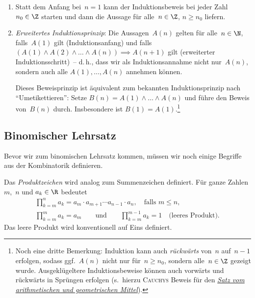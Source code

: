 \documentclass[a4paper]{article}
\begin{document}
\begin{remark}\leavevmode
    \begin{enumerate}
        \item Statt dem Anfang bei~$n = 1$ kann der Induktionsbeweis bei jeder Zahl~$n_0 \in \Z$ starten und dann die Aussage für alle~$n \in \Z$, $n \geq n_0$ liefern.
        \item \emph{Erweitertes Induktionsprinzip}: Die Aussagen~$A(n)$ gelten für alle~$n \in \N$, falls~$A(1)$ gilt (Induktionsanfang) und falls $(A(1) \wedge A(2) \wedge \dots \wedge A(n)) \implies A(n + 1)$ gilt (erweiterter Induktionsschritt)~-- d.\,h., dass wir als Induktionsannahme nicht nur~$A(n)$, sondern auch alle $A(1), \dots, A(n)$ annehmen können.

              Dieses Beweisprinzip ist äquivalent zum bekannten Induktionsprinzip nach "`Umetikettieren"': Setze $B(n) = A(1) \wedge \dots \wedge A(n)$ und führe den Beweis von~$B(n)$ durch. Insbesondere ist $B(1) = A(1)$.\footnote{Noch eine dritte Bemerkung: Induktion kann auch \emph{rückwärts} von~$n$ auf~$n - 1$ erfolgen, sodass ggf.\ $A(n)$ nicht nur für~$n \geq n_0$, sondern alle~$n \in \Z$ gezeigt wurde. Ausgeklügeltere Induktionsbeweise können auch vorwärts und rückwärts in Sprüngen erfolgen (s.~hierzu \textsc{Cauchys} Beweis für den \href{https://de.wikipedia.org/wiki/Ungleichung_vom_arithmetischen_und_geometrischen_Mittel\#Beweis_mit_Vorw\%C3\%A4rts-R\%C3\%BCckw\%C3\%A4rts-Induktion}{\emph{Satz vom arithmetischen und geometrischen Mittel}}).}
    \end{enumerate}
\end{remark}

\subsection{Binomischer Lehrsatz}

Bevor wir zum binomischen Lehrsatz kommen, müssen wir noch einige Begriffe aus der Kombinatorik definieren.

\begin{notation}[Produktzeichen]
    Das \emph{Produktzeichen} wird analog zum Summenzeichen definiert. Für ganze Zahlen $m$,~$n$ und $a_k \in \R$ bedeutet
    \begin{gather*}
        \prod_{k=m}^n a_k = a_m \cdot a_{m+1} \cdots a_{n-1} \cdot a_n, \quad\text{falls } m \leq n, \\
        \prod_{k=m}^m a_k = a_m \qquad\text{und}\qquad \prod_{k=m}^{m-1} a_k = 1 \quad\text{(leeres Produkt)}.
    \end{gather*}
    Das leere Produkt wird konventionell auf Eins definiert.
\end{notation}
\end{document}
